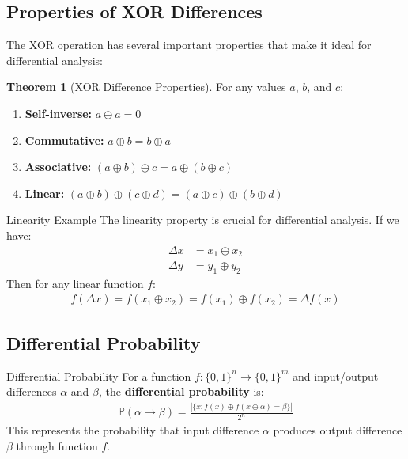\documentclass[12pt,a4paper]{article}
\theoremstyle{definition}
\newtheorem{theorem}{Theorem}[section]
\newcommand{\diff}{\Delta}
\newcommand{\prob}{\mathbb{P}}
\begin{document}
\subsection{Properties of XOR Differences}

The XOR operation has several important properties that make it ideal for differential analysis:

\begin{theorem}[XOR Difference Properties]
For any values $a$, $b$, and $c$:
\begin{enumerate}
    \item \textbf{Self-inverse:} $a \oplus a = 0$
    \item \textbf{Commutative:} $a \oplus b = b \oplus a$
    \item \textbf{Associative:} $(a \oplus b) \oplus c = a \oplus (b \oplus c)$
    \item \textbf{Linear:} $(a \oplus b) \oplus (c \oplus d) = (a \oplus c) \oplus (b \oplus d)$
\end{enumerate}
\end{theorem}

\begin{examplebox}{Linearity Example}
The linearity property is crucial for differential analysis. If we have:
\begin{align}
\diff x &= x_1 \oplus x_2 \\
\diff y &= y_1 \oplus y_2
\end{align}
Then for any linear function $f$:
\begin{align}
f(\diff x) = f(x_1 \oplus x_2) = f(x_1) \oplus f(x_2) = \diff f(x)
\end{align}
\end{examplebox}

\subsection{Differential Probability}

\begin{definitionbox}{Differential Probability}
For a function $f: \{0,1\}^n \rightarrow \{0,1\}^m$ and input/output differences $\alpha$ and $\beta$, the \textbf{differential probability} is:
\begin{align}
\prob(\alpha \rightarrow \beta) = \frac{|\{x : f(x) \oplus f(x \oplus \alpha) = \beta\}|}{2^n}
\end{align}
This represents the probability that input difference $\alpha$ produces output difference $\beta$ through function $f$.
\end{definitionbox}
\end{document}
